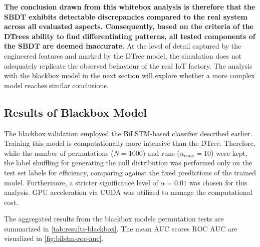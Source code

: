 \textbf{The conclusion drawn from this whitebox analysis is therefore that the SBDT exhibits detectable discrepancies compared to the real system across all evaluated aspects. Consequently, based on the criteria of the DTrees ability to find differentiating patterns, all tested components of the SBDT are deemed inaccurate.} At the level of detail captured by the engineered features and marked by the DTree model, the simulation does not adequately replicate the observed behaviour of the real IoT factory. The analysis with the blackbox model in the next section will explore whether a more complex model reaches similar conclusions.

\subsection*{Results of Blackbox Model}

The blackbox validation employed the BiLSTM-based classifier described earlier. Training this model is computationally more intensive than the DTree. Therefore, while the number of permutations ($N=1000$) and runs ($n_{runs}=10$) were kept, the label shuffling for generating the null distribution was performed only on the test set labels for efficiency, comparing against the fixed predictions of the trained model. Furthermore, a stricter significance level of $\alpha = 0.01$ was chosen for this analysis. GPU acceleration via CUDA \autocite{NVIDIA_CUDA} was utilized to manage the computational cost.

The aggregated results from the blackbox models permutation tests are summarized in \autoref{tab:results-blackbox}. The mean AUC scores $\overline{\text{ROC AUC}}$ are visualized in \autoref{fig:bilstm-roc-auc}.

